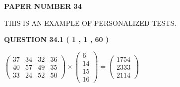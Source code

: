 \documentclass[12pt]{article}
\begin{document}
   
   
   
 {\textbf{ \Large{ PAPER NUMBER  34  }}}
   
   
\vspace{0.2in}
   
   
   
   
   
   
 \vspace{0.2in}
{\Huge  THIS IS AN EXAMPLE OF}
{\Huge  PERSONALIZED TESTS. }
   
   
  
\vspace{0.2in}
  
{\textbf{\Large{QUESTION
34.1 
 ( 1 , 1 , 60 )
}}}
  
  
 
 
\noindent{}

 
$\left( \begin{array}{ccccccccccccccc}
 37  & 
 34  & 
 32  & 
 36  \\ 
 40  & 
 57  & 
 49  & 
 35  \\ 
 33  & 
 24  & 
 52  & 
 50
\end{array}\right) \times
\left( \begin{array}{c}
 6  \\ 
 14  \\ 
 15  \\ 
 16
\end{array}\right)  =
\left( \begin{array}{c}
 1754  \\ 
 2333  \\ 
 2114
\end{array}\right)  $
 
\end{document}
